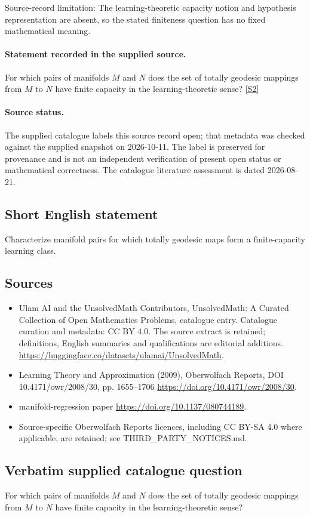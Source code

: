 \documentclass[11pt]{article}
\begin{document}
Source-record limitation: The learning-theoretic capacity notion and hypothesis representation are absent, so the stated finiteness question has no fixed mathematical meaning.
\paragraph{Statement recorded in the supplied source.}
For which pairs of manifolds $M$ and $N$ does the set of totally geodesic mappings from $M$ to $N$ have finite capacity in the learning-theoretic sense? \href{https://doi.org/10.4171/owr/2008/30}{[S2]}
\paragraph{Source status.}
The supplied catalogue labels this source record open; that metadata was checked against the supplied snapshot on 2026-10-11. The label is preserved for provenance and is not an independent verification of present open status or mathematical correctness. The catalogue literature assessment is dated 2026-08-21.
\subsection{Short English statement}
Characterize manifold pairs for which totally geodesic maps form a finite-capacity learning class.
\subsection{Sources}
\begin{itemize}
\item[S1] Ulam AI and the UnsolvedMath Contributors, UnsolvedMath: A Curated Collection of Open Mathematics Problems, catalogue entry. Catalogue curation and metadata: CC BY 4.0. The source extract is retained; definitions, English summaries and qualifications are editorial additions.
\url{https://huggingface.co/datasets/ulamai/UnsolvedMath}.
\item[S2] Learning Theory and Approximation (2009), Oberwolfach Reports, DOI 10.4171/owr/2008/30, pp. 1655--1706
\url{https://doi.org/10.4171/owr/2008/30}.
\item[S3] manifold-regression paper
\url{https://doi.org/10.1137/080744189}.
\item Source-specific Oberwolfach Reports licences, including CC BY-SA 4.0 where applicable, are retained; see THIRD\_PARTY\_NOTICES.md.
\end{itemize}
\subsection{Verbatim supplied catalogue question}
For which pairs of manifolds $M$ and $N$ does the set of totally geodesic mappings from $M$ to $N$ have finite capacity in the learning-theoretic sense?
\end{document}
